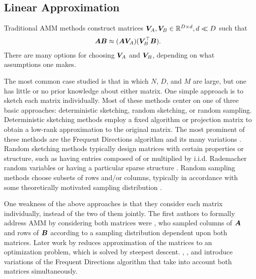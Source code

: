 
\subsection{Linear Approximation}

Traditional AMM methods construct matrices $\bm{V}_A, \bm{V}_B \in \mathbb{R}^{D \times d}, d \ll D$ such that
\begin{align}
    \bm{A} \bm{B} \approx (\bm{A} \bm{V}_A) (\bm{V}_B^\top \bm{B}).
\end{align}
There are many options for choosing $\bm{V}_A$ and $\bm{V}_B$, depending on what assumptions one makes.

The most common case studied is that in which $N$, $D$, and $M$ are large, but one has little or no prior knowledge about either matrix. One simple approach is to sketch each matrix individually. Most of these methods center on one of three basic approaches: deterministic sketching, random sketching, or random sampling. Deterministic sketching methods employ a fixed algorithm or projection matrix to obtain a low-rank approximation to the original matrix. The most prominent of these methods are the Frequent Directions algorithm \cite{liberty_simple_2012, ghashami_frequent_2016} and its many variations \cite{teng_fast_2019, francis_practical_2018, ye_frequent_2016, huang_near_2019, luo_robust_2019, francis_improvement_2018}. Random sketching methods typically design matrices with certain properties or structure, such as having entries composed of or multiplied by i.i.d. Rademacher random variables \cite{sarlos_improved_2006, kyrillidis_approximate_2014, pagh_compressed_2013} or having a particular sparse structure \cite{osnap}. Random sampling methods choose subsets of rows and/or columns, typically in accordance with some theoretically motivated sampling distribution \cite{drineas_fast_2006-1, drineas_fast_2006-2}.

One weakness of the above approaches is that they consider each matrix individually, instead of the two of them jointly. The first authors to formally address AMM by considering both matrices were \citet{drineas_fast_2006}, who sampled columns of $\bm{A}$ and rows of $\bm{B}$ according to a sampling distribution dependent upon both matrices. Later work by \citet{manne_fast_2014} reduces approximation of the matrices to an optimization problem, which is solved by steepest descent. \citet{mroueh_co-occuring_2016}, \citet{ye_frequent_2016}, and \citet{francis_improvement_2018} introduce variations of the Frequent Directions algorithm that take into account both matrices simultaneously.

